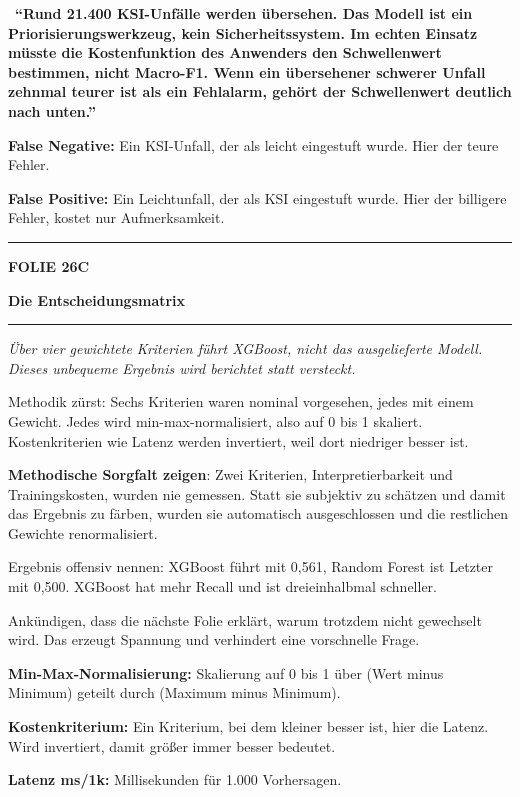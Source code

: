 \documentclass[9pt]{extarticle}
\newcommand{\karte}[3]{%
  \clearpage
  {\color{Accent}\rule{\linewidth}{2.4pt}}\par\vspace{2.5pt}
  {\fontsize{8}{9}\selectfont\bfseries\color{Accent}%
   FOLIE #1\hspace{1.2em}\textbar\hspace{1.2em}#2}\par\vspace{1pt}
  {\fontsize{16}{18}\selectfont\bfseries\color{AccentDark}#3}\par\vspace{3pt}
  {\color{Accent!45}\rule{\linewidth}{0.5pt}}\par\vspace{4pt}%
}
\newcommand{\rubrik}[1]{%
  \vspace{3.5pt}{\fontsize{7.5}{8.5}\selectfont\bfseries\color{Grau}%
  \MakeUppercase{#1}}\par\vspace{1.5pt}}
\newcommand{\kernsatz}[1]{%
  \begin{tcolorbox}[enhanced,sharp corners,boxrule=0pt,
    leftrule=2.2pt,colframe=Accent,colback=AccentPale,
    left=5pt,right=5pt,top=3.5pt,bottom=3.5pt,before skip=1pt,after skip=2pt]
    \color{AccentDark}\itshape #1
  \end{tcolorbox}}
\newcommand{\merksatz}[1]{%
  \vspace{2pt}{\color{KSI}$\blacktriangleright$}\ \textbf{\color{KSI}#1}\par}
\newcommand{\bg}[2]{\item \textbf{#1:} #2}
\begin{document}
\merksatz{\enquote{Rund 21.400 KSI-Unfälle werden übersehen. Das Modell ist ein
Priorisierungswerkzeug, kein Sicherheitssystem. Im echten Einsatz müsste die Kostenfunktion des
Anwenders den Schwellenwert bestimmen, nicht Macro-F1. Wenn ein übersehener schwerer Unfall
zehnmal teurer ist als ein Fehlalarm, gehört der Schwellenwert deutlich nach unten.}}

\rubrik{Begriffe}
\begin{begriff}
  \bg{False Negative}{Ein KSI-Unfall, der als leicht eingestuft wurde. Hier der teure Fehler.}
  \bg{False Positive}{Ein Leichtunfall, der als KSI eingestuft wurde. Hier der billigere Fehler,
      kostet nur Aufmerksamkeit.}
\end{begriff}

\karte{26}{C}{Die Entscheidungsmatrix}

\kernsatz{Über vier gewichtete Kriterien führt XGBoost, nicht das ausgelieferte Modell.
Dieses unbequeme Ergebnis wird berichtet statt versteckt.}

\rubrik{Sagen}
\begin{sag}
  \item Methodik zürst: Sechs Kriterien waren nominal vorgesehen, jedes mit einem Gewicht. Jedes
        wird min-max-normalisiert, also auf 0 bis 1 skaliert. Kostenkriterien wie Latenz werden
        invertiert, weil dort niedriger besser ist.
  \item \textbf{Methodische Sorgfalt zeigen}: Zwei Kriterien, Interpretierbarkeit und
        Trainingskosten, wurden nie gemessen. Statt sie subjektiv zu schätzen und damit das
        Ergebnis zu färben, wurden sie automatisch ausgeschlossen und die restlichen Gewichte
        renormalisiert.
  \item Ergebnis offensiv nennen: XGBoost führt mit 0,561, Random Forest ist Letzter mit 0,500.
        XGBoost hat mehr Recall und ist dreieinhalbmal schneller.
  \item Ankündigen, dass die nächste Folie erklärt, warum trotzdem nicht gewechselt wird.
        Das erzeugt Spannung und verhindert eine vorschnelle Frage.
\end{sag}

\rubrik{Begriffe}
\begin{begriff}
  \bg{Min-Max-Normalisierung}{Skalierung auf 0 bis 1 über (Wert minus Minimum) geteilt durch
      (Maximum minus Minimum).}
  \bg{Kostenkriterium}{Ein Kriterium, bei dem kleiner besser ist, hier die Latenz. Wird invertiert,
      damit größer immer besser bedeutet.}
  \bg{Latenz ms/1k}{Millisekunden für 1.000 Vorhersagen.}
\end{begriff}
\end{document}
